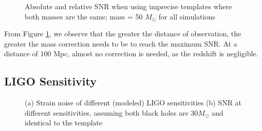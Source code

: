 \documentclass{article}
\begin{document}
\begin{figure}[!htb]
    \caption{\label{fig:imprecisedistance} Absolute and relative SNR when using imprecise templates where both masses are the same; mass = 50 $M_\odot$ for all simulations}
\end{figure}

From Figure \ref{fig:imprecisedistance}, we observe that the greater the distance of observation, the greater the mass correction needs to be to reach the maximum SNR. At a distance of $100$ Mpc, almost no correction is needed, as the redshift is negligible. 

\subsection{LIGO Sensitivity}

\begin{figure}[!htb]
    \centering
    \caption{\label{fig:psd} (a) Strain noise of different (modeled) LIGO sensitivities (b) SNR at different sensitivities, assuming both black holes are $30 M_\odot$ and identical to the template}
\end{figure}
\end{document}
